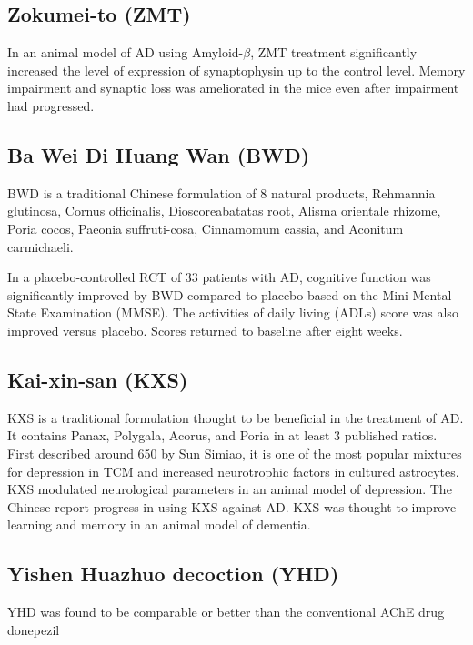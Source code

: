 \documentclass[twocolumn]{article}
\begin{document}
\subsection{Zokumei-to (ZMT)}

In an animal model of AD using Amyloid-$\beta$,
ZMT treatment significantly increased the level of expression of
synaptophysin up to the control level.
Memory impairment and synaptic loss was ameliorated in the mice
even after impairment had progressed.
\cite{tohda2003repair}



\subsection{Ba Wei Di Huang Wan (BWD)}
BWD is a traditional Chinese formulation of 8 natural products,
Rehmannia glutinosa,
Cornus officinalis,
Dioscoreabatatas root,
Alisma orientale rhizome,
Poria cocos,
Paeonia suffruti-cosa,
Cinnamomum cassia,
and Aconitum carmichaeli.

In a placebo-controlled RCT of 33 patients with AD,
cognitive function was significantly improved by BWD compared to placebo
based on the Mini-Mental State Examination (MMSE).
The activities of daily living (ADLs) score was also improved
versus placebo.
Scores returned to baseline after eight weeks.
\cite{iwasaki2004randomized}




\subsection{Kai-xin-san (KXS)}
KXS is a traditional formulation thought to be beneficial in the treatment
of AD.
It contains
Panax,
Polygala,
Acorus,
and Poria in at least 3 published ratios.
First described around 650 by Sun Simiao,
it is one of the most popular mixtures for depression in TCM
and increased neurotrophic factors in cultured astrocytes.
\cite{zhu2013kai}
KXS modulated neurological parameters in an animal model of depression.
\cite{zhu2012standardized}
The Chinese report progress in using KXS against AD.
\cite{wen2013research}
KXS was thought to improve learning and memory in an animal model of dementia.
\cite{li2009effects}






\subsection{Yishen Huazhuo decoction (YHD)}
YHD was found to be comparable or better than
the conventional AChE drug donepezil
\end{document}
